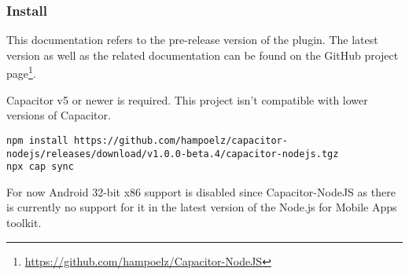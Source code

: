 \subsubsection{Install}
\label{sec:Capacitor-NodeJS:Install}

This documentation refers to the pre-release version  of the plugin.
The latest version as well as the related documentation can be found on the GitHub project page\footnote{\url{https://github.com/hampoelz/Capacitor-NodeJS}}.

Capacitor v5 or newer is required. This project isn't compatible with lower versions of Capacitor.

\begin{verbatim}
npm install https://github.com/hampoelz/capacitor-nodejs/releases/download/v1.0.0-beta.4/capacitor-nodejs.tgz
npx cap sync
\end{verbatim}

\begin{note}[Note]
  For now Android 32-bit x86 support is disabled since Capacitor-NodeJS  as there is currently no support for it in the latest version of the Node.js for Mobile Apps toolkit.
  \cite{nodejs-mobile}
\end{note}
